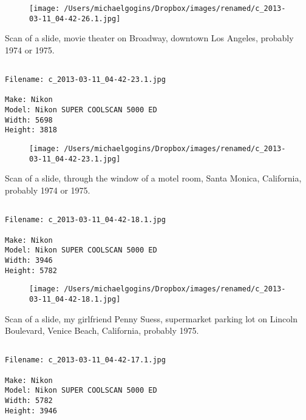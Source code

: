 \begin{figure}
\texttt{[image: /Users/michaelgogins/Dropbox/images/renamed/c\_2013-03-11\_04-42-26.1.jpg]}
\end{figure}
    
\clearpage
\onecolumn
\noindent Scan of a slide, movie theater on Broadway, downtown Los Angeles, probably 1974 or 1975.
\noindent
\begin{lstlisting}

Filename: c_2013-03-11_04-42-23.1.jpg

Make: Nikon
Model: Nikon SUPER COOLSCAN 5000 ED
Width: 5698
Height: 3818
\end{lstlisting}
\clearpage

\begin{figure}
\texttt{[image: /Users/michaelgogins/Dropbox/images/renamed/c\_2013-03-11\_04-42-23.1.jpg]}
\end{figure}
    
\clearpage
\onecolumn
\noindent Scan of a slide, through the window of a motel room, Santa Monica, California, probably 1974 or 1975.
\noindent
\begin{lstlisting}

Filename: c_2013-03-11_04-42-18.1.jpg

Make: Nikon
Model: Nikon SUPER COOLSCAN 5000 ED
Width: 3946
Height: 5782
\end{lstlisting}
\clearpage

\begin{figure}
\texttt{[image: /Users/michaelgogins/Dropbox/images/renamed/c\_2013-03-11\_04-42-18.1.jpg]}
\end{figure}
    
\clearpage
\onecolumn
\noindent Scan of a slide, my girlfriend Penny Suess, supermarket parking lot on Lincoln Boulevard, Venice Beach, California, probably 1975.
\noindent
\begin{lstlisting}

Filename: c_2013-03-11_04-42-17.1.jpg

Make: Nikon
Model: Nikon SUPER COOLSCAN 5000 ED
Width: 5782
Height: 3946
\end{lstlisting}
\clearpage

